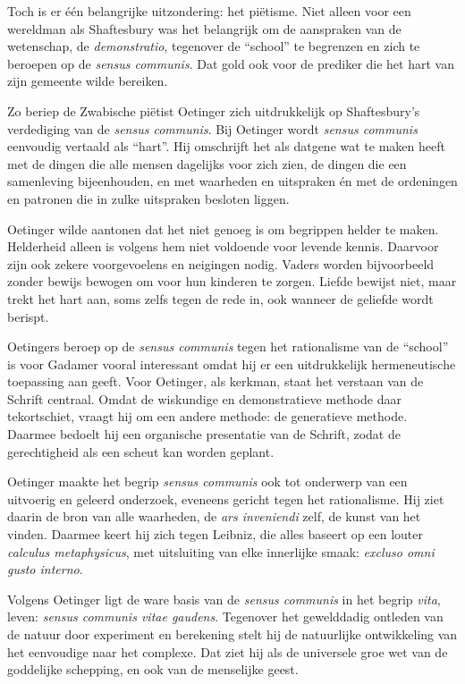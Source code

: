 Toch is er één belangrijke uitzondering: het piëtisme. Niet alleen voor een wereldman als Shaftesbury was het belangrijk om de aanspraken van de wetenschap, de \textit{demonstratio}, tegenover de ``school'' te begrenzen en zich te beroepen op de \textit{sensus communis}. Dat gold ook voor de prediker die het hart van zijn gemeente wilde bereiken.

Zo beriep de Zwabische piëtist Oetinger zich uitdrukkelijk op Shaftesbury's verdediging van de \textit{sensus communis}. Bij Oetinger wordt \textit{sensus communis} eenvoudig vertaald als ``hart''. Hij omschrijft het als datgene wat te maken heeft met de dingen die alle mensen dagelijks voor zich zien, de dingen die een samenleving bijeenhouden, en met waarheden en uitspraken én met de ordeningen en patronen die in zulke uitspraken besloten liggen.

Oetinger wilde aantonen dat het niet genoeg is om begrippen helder te maken. Helderheid alleen is volgens hem niet voldoende voor levende kennis. Daarvoor zijn ook zekere voorgevoelens en neigingen nodig. Vaders worden bijvoorbeeld zonder bewijs bewogen om voor hun kinderen te zorgen. Liefde bewijst niet, maar trekt het hart aan, soms zelfs tegen de rede in, ook wanneer de geliefde wordt berispt.

Oetingers beroep op de \textit{sensus communis} tegen het rationalisme van de ``school'' is voor Gadamer vooral interessant omdat hij er een uitdrukkelijk hermeneutische toepassing aan geeft. Voor Oetinger, als kerkman, staat het verstaan van de Schrift centraal. Omdat de wiskundige en demonstratieve methode daar tekortschiet, vraagt hij om een andere methode: de generatieve methode. Daarmee bedoelt hij een organische presentatie van de Schrift, zodat de gerechtigheid als een scheut kan worden geplant.

Oetinger maakte het begrip \textit{sensus communis} ook tot onderwerp van een uitvoerig en geleerd onderzoek, eveneens gericht tegen het rationalisme. Hij ziet daarin de bron van alle waarheden, de \textit{ars inveniendi} zelf, de kunst van het vinden. Daarmee keert hij zich tegen Leibniz, die alles baseert op een louter \textit{calculus metaphysicus}, met uitsluiting van elke innerlijke smaak: \textit{excluso omni gusto interno}.

Volgens Oetinger ligt de ware basis van de \textit{sensus communis} in het begrip \textit{vita}, leven: \textit{sensus communis vitae gaudens}. Tegenover het gewelddadig ontleden van de natuur door experiment en berekening stelt hij de natuurlijke ontwikkeling van het eenvoudige naar het complexe. Dat ziet hij als de universele groe wet van de goddelijke schepping, en ook van de menselijke geest.


